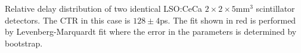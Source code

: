 \label{fig:delaydist} Relative delay distribution of two identical LSO:CeCa $2\times2\times5$mm$^3$ scintillator detectors. The CTR in this case is $128\pm4$ps. The fit shown in red is performed by Levenberg-Marquardt fit where the error in the parameters is determined by bootstrap.